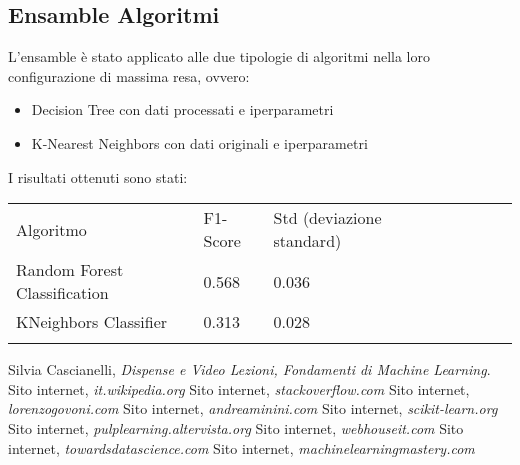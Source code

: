 \documentclass[10pt,a4paper]{article}
\begin{document}
\subsection{Ensamble Algoritmi}
L'ensamble è stato applicato alle due tipologie di algoritmi nella loro configurazione di massima resa, ovvero:

\begin{itemize}
    \item Decision Tree con dati processati e iperparametri
\end{itemize}
\begin{itemize}
    \item K-Nearest Neighbors con dati originali e iperparametri
\end{itemize}
I risultati ottenuti sono stati:

\begin{table}[ht]
\centering
\begin{tabular}{llllllll}
Algoritmo                    & F1-Score & Std (deviazione standard)&  &   \\
Random Forest Classification & 0.568   & 0.036    &  &   \\
KNeighbors Classifier        & 0.313   & 0.028    &  &   \\
                             &         &          &  &  
\end{tabular}
\end{table}

\clearpage
\begin{thebibliography}{9}
\bibitem{}
        Silvia Cascianelli,
        \textit{Dispense e Video Lezioni, Fondamenti di Machine Learning}.
    \bibitem{}
        Sito internet,
        \textit{it.wikipedia.org}
    \bibitem{}
        Sito internet,
        \textit{stackoverflow.com}
    \bibitem{}
        Sito internet,
        \textit{lorenzogovoni.com}
    \bibitem{}
        Sito internet,
        \textit{andreaminini.com}
    \bibitem{}
        Sito internet,
        \textit{scikit-learn.org}
    \bibitem{}
        Sito internet,
        \textit{pulplearning.altervista.org}
    \bibitem{}
        Sito internet,
        \textit{webhouseit.com}
    \bibitem{}
        Sito internet,
        \textit{towardsdatascience.com}
    \bibitem{}
        Sito internet,
        \textit{machinelearningmastery.com}
    
\end{thebibliography}
\end{document}
